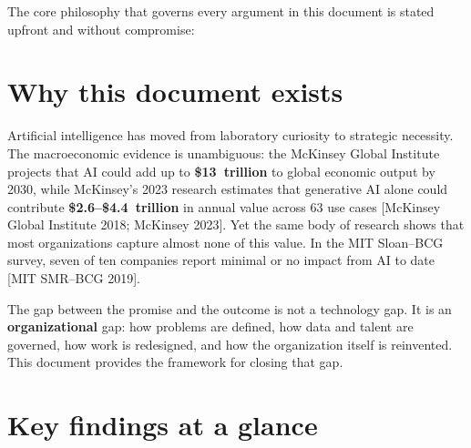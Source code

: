 
The core philosophy that governs every argument in this document is stated
upfront and without compromise:

\begin{center}
\end{center}

\section{Why this document exists}

Artificial intelligence has moved from laboratory curiosity to strategic
necessity. The macroeconomic evidence is unambiguous: the McKinsey Global
Institute projects that AI could add up to \textbf{\$13~trillion} to global
economic output by 2030, while McKinsey's 2023 research estimates that
generative AI alone could contribute \textbf{\$2.6--\$4.4~trillion} in
annual value across 63 use cases [McKinsey Global Institute 2018; McKinsey
2023]. Yet the same body of research shows that most organizations capture
almost none of this value. In the MIT Sloan--BCG survey, seven of ten
companies report minimal or no impact from AI to date [MIT SMR--BCG 2019].

The gap between the promise and the outcome is not a technology gap. It is
an \textbf{organizational} gap: how problems are defined, how data and talent
are governed, how work is redesigned, and how the organization itself is
reinvented. This document provides the framework for closing that gap.

\section{Key findings at a glance}

\begin{center}
  \hfill
  \hfill
\end{center}

